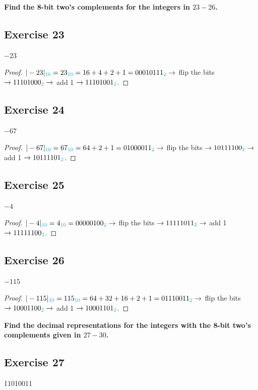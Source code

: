 \documentclass[14pt]{extarticle}
\newcommand{\base}[1]{{\color{cyan}#1}}
\begin{document}
{\bf\color{cyan} Find the 8-bit two’s complements for the integers in $23-26$.}

\subsection{Exercise 23}
$-23$

\begin{proof}
$|-23|_\base{10} = 23_\base{10} = 16 + 4 + 2 + 1 = 00010111_\base{2} \to$ flip the bits $\to 11101000_\base{2} \to$ add 1 $\to 11101001_\base{2}$.
\end{proof}

\subsection{Exercise 24}
$-67$

\begin{proof} $|-67|_\base{10} = 67_\base{10} = 64 + 2 + 1 = 01000011_\base{2} \to$ flip the bits $\to 10111100_\base{2} \to$ add 1 $\to 10111101_\base{2}$.
\end{proof}

\subsection{Exercise 25}
$-4$

\begin{proof}
$|-4|_\base{10} = 4_\base{10} = 00000100_\base{2} \to$ flip the
bits $\to 11111011_\base{2} \to$ add 1 $\to 11111100_\base{2}$. \end{proof}

\subsection{Exercise 26}
$-115$

\begin{proof}
$|-115|_\base{10} = 115_\base{10} = 64 + 32 + 16 + 2 + 1 = 01110011_\base{2} \to$ flip the bits $\to 10001100_\base{2} \to$ add 1 $\to 10001101_\base{2}$.
\end{proof}

{\bf\color{cyan} Find the decimal representations for the integers with the 8-bit two’s complements given in $27-30$.}

\subsection{Exercise 27}
11010011
\end{document}
